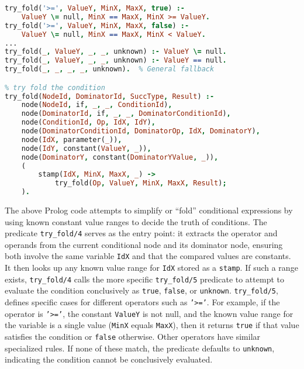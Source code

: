 \smallbreak
\begin{lstlisting}[language=Prolog]
% Constant condition: value stamp available and deterministic
try_fold('>=', ValueY, MinX, MaxX, true) :- 
    ValueY \= null, MinX == MaxX, MinX >= ValueY.
try_fold('>=', ValueY, MinX, MaxX, false) :- 
    ValueY \= null, MinX == MaxX, MinX < ValueY.
...
try_fold(_, ValueY, _, _, unknown) :- ValueY \= null.
try_fold(_, ValueY, _, _, unknown) :- ValueY == null.
try_fold(_, _, _, _, unknown).  % General fallback

% try fold the condition
try_fold(NodeId, DominatorId, SuccType, Result) :-
    node(NodeId, if, _, _, ConditionId),
    node(DominatorId, if, _, _, DominatorConditionId),
    node(ConditionId, Op, IdX, IdY),
    node(DominatorConditionId, DominatorOp, IdX, DominatorY),
    node(IdX, parameter(_)),
    node(IdY, constant(ValueY, _)),
    node(DominatorY, constant(DominatorYValue, _)),
    (
        stamp(IdX, MinX, MaxX, _) ->
            try_fold(Op, ValueY, MinX, MaxX, Result);
    ).
\end{lstlisting}
\smallbreak
The above Prolog code attempts to simplify or “fold” conditional expressions by using known constant value ranges to decide the truth of conditions. The predicate \texttt{try\_fold/4} serves as the entry point: it extracts the operator and operands from the current conditional node and its dominator node, ensuring both involve the same variable \texttt{IdX} and that the compared values are constants. It then looks up any known value range for \texttt{IdX} stored as a \texttt{stamp}. If such a range exists, \texttt{try\_fold/4} calls the more specific \texttt{try\_fold/5} predicate to attempt to evaluate the condition conclusively as \texttt{true}, \texttt{false}, or \texttt{unknown}. \texttt{try\_fold/5}, defines specific cases for different operators such as \texttt{'>='}. For example, if the operator is \texttt{'>='}, the constant \texttt{ValueY} is not null, and the known value range for the variable is a single value (\texttt{MinX} equals \texttt{MaxX}), then it returns \texttt{true} if that value satisfies the condition or \texttt{false} otherwise. Other operators have similar specialized rules. If none of these match, the predicate defaults to \texttt{unknown}, indicating the condition cannot be conclusively evaluated.

